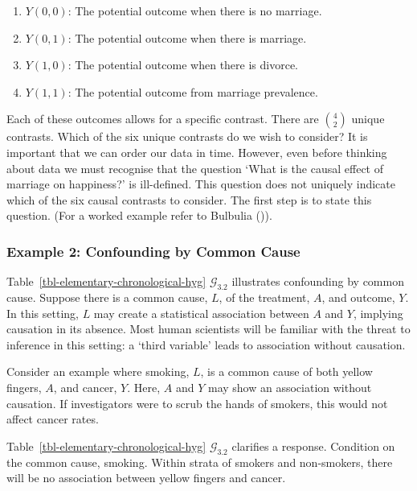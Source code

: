 \documentclass[
  single column]{article}
\providecommand{\tightlist}{%
  \setlength{\itemsep}{0pt}\setlength{\parskip}{0pt}}\usepackage{longtable,booktabs,array}
\begin{document}
\begin{enumerate}
\def\labelenumi{\arabic{enumi}.}
\tightlist
\item
  \(Y(0, 0)\): The potential outcome when there is no marriage.
\item
  \(Y(0, 1)\): The potential outcome when there is marriage.
\item
  \(Y(1, 0)\): The potential outcome when there is divorce.
\item
  \(Y(1, 1)\): The potential outcome from marriage prevalence.
\end{enumerate}

Each of these outcomes allows for a specific contrast. There are
\(\binom{4}{2}\) unique contrasts. Which of the six unique contrasts do
we wish to consider? It is important that we can order our data in time.
However, even before thinking about data we must recognise that the
question `What is the causal effect of marriage on happiness?' is
ill-defined. This question does not uniquely indicate which of the six
causal contrasts to consider. The first step is to state this question.
(For a worked example refer to Bulbulia
()).

\subsubsection{Example 2: Confounding by Common
Cause}\label{example-2-confounding-by-common-cause}

Table~\ref{tbl-elementary-chronological-hyg} \(\mathcal{G}_{3.2}\)
illustrates confounding by common cause. Suppose there is a common
cause, \(L\), of the treatment, \(A\), and outcome, \(Y\). In this
setting, \(L\) may create a statistical association between \(A\) and
\(Y\), implying causation in its absence. Most human scientists will be
familiar with the threat to inference in this setting: a `third
variable' leads to association without causation.

Consider an example where smoking, \(L\), is a common cause of both
yellow fingers, \(A\), and cancer, \(Y\). Here, \(A\) and \(Y\) may show
an association without causation. If investigators were to scrub the
hands of smokers, this would not affect cancer rates.

Table~\ref{tbl-elementary-chronological-hyg} \(\mathcal{G}_{3.2}\)
clarifies a response. Condition on the common cause, smoking. Within
strata of smokers and non-smokers, there will be no association between
yellow fingers and cancer.
\end{document}
